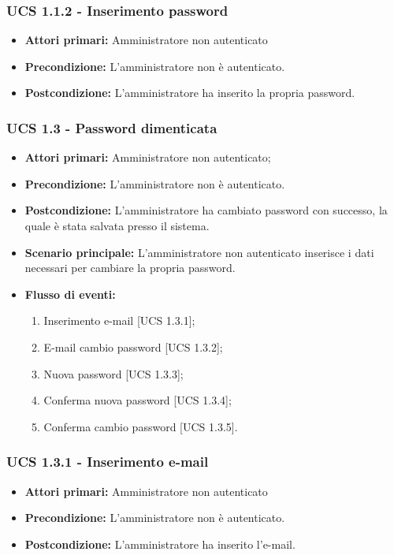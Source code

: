 \subsubsection{UCS 1.1.2 - Inserimento password}%
\begin{itemize}
\item \textbf{Attori primari:} Amministratore non autenticato
\item \textbf{Precondizione:} L'amministratore non è autenticato.
\item \textbf{Postcondizione:} L'amministratore ha inserito la propria password.
\end{itemize}

\subsubsection{UCS 1.3 - Password dimenticata}%
\begin{itemize}
\item \textbf{Attori primari:} Amministratore non autenticato;
\item \textbf{Precondizione:}  L'amministratore non è autenticato.
\item \textbf{Postcondizione:} L'amministratore ha cambiato password con successo, la quale è stata salvata presso il sistema.
\item \textbf{Scenario principale:} L'amministratore non autenticato inserisce i dati necessari per cambiare la propria password.
\item \textbf{Flusso di eventi:}
    \begin{enumerate}
        \item Inserimento e-mail [UCS 1.3.1];
        \item E-mail cambio password [UCS 1.3.2];
        \item Nuova password [UCS 1.3.3];
        \item Conferma nuova password [UCS 1.3.4];
        \item Conferma cambio password [UCS 1.3.5].
    \end{enumerate}
\end{itemize}

\subsubsection{UCS 1.3.1 - Inserimento e-mail}
\begin{itemize}
\item \textbf{Attori primari:} Amministratore non autenticato
\item \textbf{Precondizione:} L'amministratore non è autenticato. %
\item \textbf{Postcondizione:} L'amministratore ha inserito l'e-mail.
\end{itemize}

